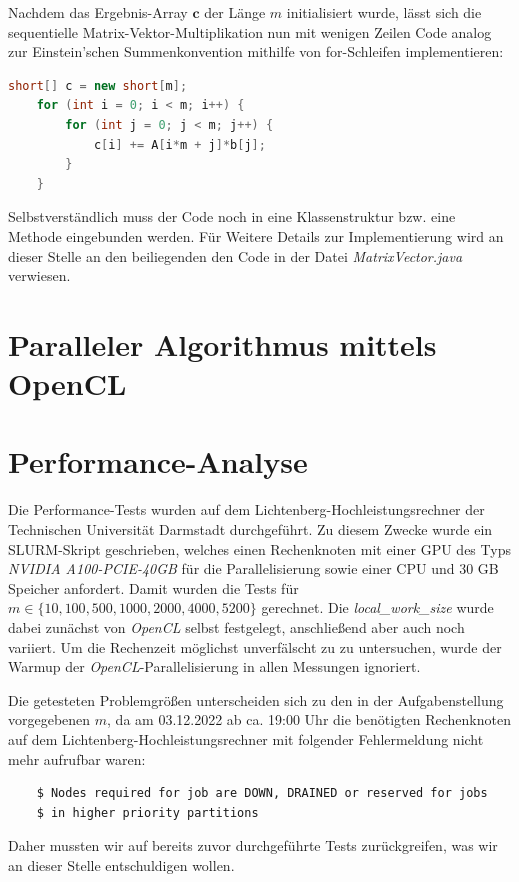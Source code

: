 \documentclass[
	ngerman,
	ruledheaders=section,
	class=report,
	thesis={type=Dokumentation},
	ignore-missing-data=true,
	accentcolor=9c,
	custommargins=false,
	marginpar=false,
	parskip=half-,
	fontsize=11pt,
]{tudapub}
\begin{document}
Nachdem das Ergebnis-Array $\mathbf{c}$ der Länge $m$ initialisiert wurde, lässt sich die sequentielle Matrix-Vektor-Multiplikation nun mit wenigen Zeilen Code analog zur Einstein'schen Summenkonvention mithilfe von for-Schleifen implementieren:
\begin{lstlisting}[language=java]
	short[] c = new short[m];
	for (int i = 0; i < m; i++) {
		for (int j = 0; j < m; j++) {
			c[i] += A[i*m + j]*b[j];
		}
	}
\end{lstlisting}
Selbstverständlich muss der Code noch in eine Klassenstruktur bzw. eine Methode eingebunden werden. Für Weitere Details zur Implementierung wird an dieser Stelle an den beiliegenden den Code in der Datei \textit{MatrixVector.java} verwiesen.

\chapter{Paralleler Algorithmus mittels OpenCL}

\chapter{Performance-Analyse}
Die Performance-Tests wurden auf dem Lichtenberg-Hochleistungsrechner der Technischen Universität Darmstadt durchgeführt. Zu diesem Zwecke wurde ein SLURM-Skript geschrieben, welches einen Rechenknoten mit einer GPU des Typs \textit{NVIDIA A100-PCIE-40GB} für die Parallelisierung sowie einer CPU und 30 GB Speicher anfordert. Damit wurden die Tests für $m \in \{10, 100, 500, 1000, 2000, 4000, 5200\}$ gerechnet. Die \textit{local\_work\_size} wurde dabei zunächst von \textit{OpenCL} selbst festgelegt, anschließend aber auch noch variiert. Um die Rechenzeit möglichst unverfälscht zu zu untersuchen, wurde der Warmup der \textit{OpenCL}-Parallelisierung in allen Messungen ignoriert.

Die getesteten Problemgrößen unterscheiden sich zu den in der Aufgabenstellung vorgegebenen $m$, da am 03.12.2022 ab ca. 19:00 Uhr die benötigten Rechenknoten auf dem Lichtenberg-Hochleistungsrechner mit folgender Fehlermeldung nicht mehr aufrufbar waren:
\begin{lstlisting}
	$ Nodes required for job are DOWN, DRAINED or reserved for jobs 
	$ in higher priority partitions
\end{lstlisting}
Daher mussten wir auf bereits zuvor durchgeführte Tests zurückgreifen, was wir an dieser Stelle entschuldigen wollen.
\end{document}
